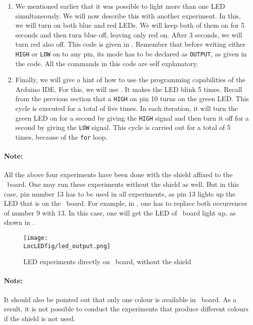 \begin{enumerate}
  \item We mentioned earlier that it was possible to light more than one
        LED simultaneously.  We will now describe this with another
        experiment.  In this, we will turn on both blue and red LEDs.  We
        will keep both of them on for 5 seconds and then turn blue off,
        leaving only red on.  After 3 seconds, we will turn red also off.
        This code is given in .  Remember that
        before writing either {\tt HIGH} or {\tt LOW} on to any pin, its
        mode has to be declared as {\tt OUTPUT}, as given in the code.  All
        the commands in this code are self explanatory.
        
  \item Finally, we will give a hint of how to use the programming
        capabilities of the Arduino IDE.  For this, we will use
        .  It makes the LED blink 5 times.  Recall
        from the previous section that a {\tt HIGH} on pin 10 turns on the
        green LED.  This cycle is executed for a total of five times.  In each
        iteration, it will turn the green LED on for a second by giving the
          {\tt HIGH} signal and then turn it off for a second by giving the
          {\tt LOW} signal.  This cycle is carried out for a total of 5 times,
        because of the {\tt for} loop.
\end{enumerate}

\paragraph{Note:}
All the above four experiments have been done with
the shield affixed to the \arduino\ board.  One may run these
experiments without the shield as well.  But in this case, pin number
13 has to be used in all experiments, as pin 13 lights up the LED that
is on the \arduino\ board.  For example, in , one
has to replace both occurrences of number 9 with 13.  In this case,
one will get the LED of \arduino\ board light up, as shown in
.
\begin{figure}
  \centering
  \texttt{[image: \\LocLEDfig/led\_output.png]}
  \caption{LED experiments directly on \arduino\ board, without the
    shield}
  \label{fig:led-uno}
\end{figure}


\paragraph{Note:} It should also be pointed out that only one colour
is available in \arduino\ board.  As a result, it is not possible to
conduct the experiments that produce different colours if the
shield is not used.

